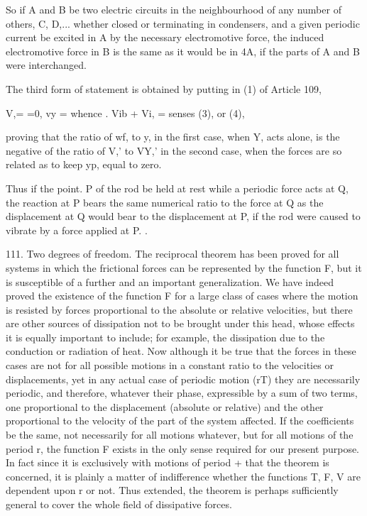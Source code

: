 So if A and B be two electric circuits in the neighbourhood of any number of
others, C, D,... whether closed or terminating in condensers, and a given
periodic current be excited in A by the necessary electromotive force, the
induced electromotive force in B is the same as it would be in 4A, if the parts
of A and B were interchanged.

The third form of statement is obtained by putting in (1) of Article 109,

V,= =0, vy = whence . Vib + Vi, = senses (3), or (4),

proving that the ratio of wf, to y, in the first case, when Y, acts alone, is
the negative of the ratio of V,' to VY,' in the second case, when the forces
are so related as to keep yp, equal to zero.

Thus if the point. P of the rod be held at rest while a periodic force acts at
Q, the reaction at P bears the same numerical ratio to the force at Q as the
displacement at Q would bear to the displacement at P, if the rod were caused
to vibrate by a force applied at P. .

111. Two degrees of freedom.  The reciprocal theorem has been proved for all
systems in which the
frictional forces can be represented by the function F, but it is susceptible
of a further and an important generalization. We have indeed proved the
existence of the function F for a large class of cases where the motion is
resisted by forces proportional to the absolute or relative velocities, but
there are other sources of dissipation not to be brought under this head, whose
effects it is equally important to include; for example, the dissipation due to
the conduction or radiation of heat. Now although it be true that the forces in
these cases are not for all possible motions in a constant ratio to the
velocities or displacements, yet in any actual case of periodic motion (rT)
they are necessarily periodic, and therefore, whatever their phase, expressible
by a sum of two terms, one proportional to the displacement (absolute or
relative) and the other proportional to the velocity of the part of the system
affected. If the coefficients be the same, not necessarily for all motions
whatever, but for all motions of the period r, the function F exists in the
only sense required for our present purpose. In fact since it is exclusively
with motions of period + that the theorem is concerned, it is plainly a matter
of indifference whether the functions T, F, V are dependent upon r or not. Thus
extended, the theorem is perhaps sufficiently general to cover the whole field
of dissipative forces.

